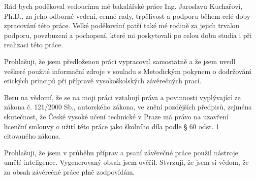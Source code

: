 \documentclass[czech,bachelor,unicode,oneside]{ctufit-thesis}
\begin{document}
 
\frontmatter\frontmatterinit %

\thispagestyle{empty}\maketitle\thispagestyle{empty}\cleardoublepage %


\imprintpage %
\stopTOCentries

\begin{acknowledgmentpage}
	Rád bych poděkoval vedoucímu mé bakalářské práce Ing. Jaroslavu Kuchařovi, Ph.D., za jeho odborné vedení, cenné rady, trpělivost a podporu během celé doby zpracování této práce.
    Velké poděkování patří také mé rodině za jejich trvalou podporu, povzbuzení a pochopení, které mi poskytovali po celou dobu studia i při realizaci této práce.
\end{acknowledgmentpage} 


\begin{declarationpage}
    Prohlašuji, že jsem předloženou práci vypracoval samostatně a že jsem uvedl veškeré použité
    informační zdroje v souladu s Metodickým pokynem o dodržování etických principů při přípravě
    vysokoškolských závěrečných prací.
    
    Beru na vědomí, že se na moji práci vztahují práva a povinnosti vyplývající ze zákona č. 121/2000 Sb.,
    autorského zákona, ve znění pozdějších předpisů, zejména skutečnost, že České vysoké učení
    technické v Praze má právo na uzavření licenční smlouvy o užití této práce jako školního díla podle §
    60 odst. 1 citovaného zákona.

    Prohlašuji, že jsem v průběhu příprav a psaní závěrečné práce použil nástroje umělé inteligence.
    Vygenerovaný obsah jsem ověřil. Stvrzuji, že jsem si vědom, že za obsah závěrečné práce plně zodpovídám.
\end{declarationpage}
\end{document}
